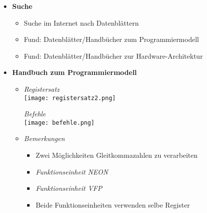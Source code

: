     \begin{itemize}
        \item \textbf{Suche}
            \begin{itemize}
                \item Suche im Internet nach Datenblättern
                \item Fund: Datenblätter/Handbücher zum Programmiermodell
                \item Fund: Datenblätter/Handbücher zur Hardware-Architektur
            \end{itemize} 

        \item \textbf{Handbuch zum Programmiermodell}
            \begin{itemize}
                \item[]
                    \begin{minipage}{0.3\textwidth}
                        \textit{Registersatz} \\
                        \texttt{[image: registersatz2.png]}
                    \end{minipage}
                    \begin{minipage}{0.6\textwidth}
                        \textit{Befehle} \\
                        \texttt{[image: befehle.png]}
                    \end{minipage}
                \item[] \textit{Bemerkungen}
                    \begin{itemize}
                        \item Zwei Möglichkeiten Gleitkommazahlen zu verarbeiten
                        \item \textit{Funktionseinheit NEON}
                        \item \textit{Funktionseinheit VFP}
                        \item Beide Funktionseinheiten verwenden selbe Register
                    \end{itemize}
            \end{itemize}


\end{itemize}
